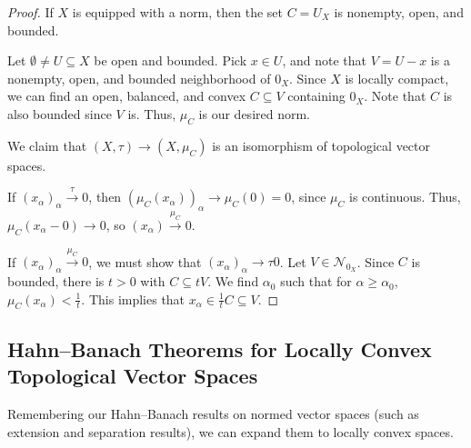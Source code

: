 \documentclass[10pt]{mypackage}
\begin{document}
\begin{proof}
  If $X$ is equipped with a norm, then the set $C = U_X$ is nonempty, open, and bounded.\newline

  Let $\emptyset\neq U\subseteq X$ be open and bounded. Pick $x\in U$, and note that $V = U-x$ is a nonempty, open, and bounded neighborhood of $0_X$. Since $X$ is locally compact, we can find an open, balanced, and convex $C\subseteq V$ containing $0_X$. Note that $C$ is also bounded since $V$ is. Thus, $\mu_{C}$ is our desired norm.\newline

  We claim that $\left(X,\tau\right)\rightarrow \left(X,\mu_{C}\right)$ is an isomorphism of topological vector spaces.\newline

  If $\left(x_{\alpha}\right)_{\alpha}\xrightarrow{\tau} 0$, then $\left(\mu_{C}\left(x_{\alpha}\right)\right)_{\alpha}\rightarrow \mu_{C}\left(0\right) = 0$, since $\mu_{C}$ is continuous. Thus, $\mu_{C}\left(x_{\alpha} - 0\right)\rightarrow 0$, so $\left(x_{\alpha}\right)\xrightarrow{\mu_{C}}0$.\newline

  If $\left(x_{\alpha}\right)_{\alpha}\xrightarrow{\mu_{C}}0$, we must show that $\left(x_{\alpha}\right)_{\alpha}\rightarrow{\tau}0$. Let $V\in \mathcal{N}_{0_X}$. Since $C$ is bounded, there is $t > 0$ with $C\subseteq tV$. We find $\alpha_0$ such that for $\alpha \geq \alpha_0$, $\mu_{C}\left(x_{\alpha}\right) < \frac{1}{t}$. This implies that $x_{\alpha}\in \frac{1}{t}C \subseteq V$.
\end{proof}
\subsection{Hahn--Banach Theorems for Locally Convex Topological Vector Spaces}%
Remembering our Hahn--Banach results on normed vector spaces (such as extension and separation results), we can expand them to locally convex spaces.
\end{document}
